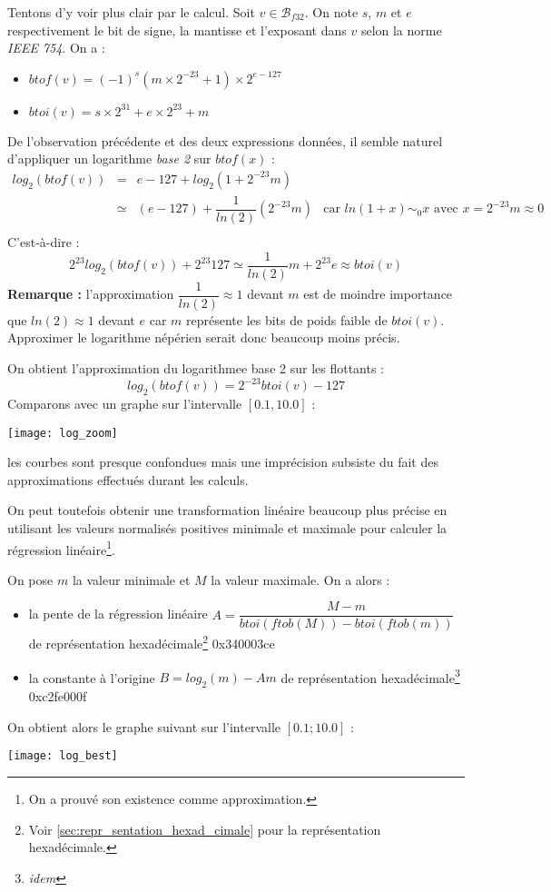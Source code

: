 \documentclass[../../main.tex]{subfiles}
\begin{document}
Tentons d'y voir plus clair par le calcul. Soit $v\in\mathcal{B}_{f32}$. On note $s$, $m$ et $e$ respectivement le bit de signe, la mantisse et l'exposant dans $v$ selon la norme \textit{IEEE 754}. On a :
\begin{itemize}
  \item $btof(v) = (-1)^{s}(m\times{2^{-23}} + 1)\times{2^{e-127}}$
  \item $btoi(v) = s\times{2^{31}} + e\times{2^23} + m$
\end{itemize}
De l'observation précédente et des deux expressions données, il semble naturel d'appliquer un logarithme \textit{base 2} sur $btof(x)$ :
$$\begin{array}{lcll}
log_2(btof(v)) & = & e - 127 + log_2\left(1 + 2^{-23}m\right) \\
& \simeq & (e - 127) + \dfrac{1}{ln(2)}\left(2^{-23}m\right) & \text{car $ln(1 + x)\sim_0 x$ avec $x = 2^{-23}m\approx{0}$} \\

\end{array}$$
C'est-à-dire :
$$2^{23}log_2(btof(v)) + 2^{23}127\simeq \dfrac{1}{ln(2)}m + 2^{23}e\approx{btoi(v)}$$
\textbf{Remarque :} l'approximation $\dfrac{1}{ln(2)}\approx 1$ devant $m$ est de moindre importance que $ln(2)\approx 1$ devant $e$ car $m$ représente les bits de poids faible de $btoi(v)$. Approximer le logarithme népérien serait donc beaucoup moins précis.

On obtient l'approximation du logarithmee base 2 sur les flottants :
$$log_2(btof(v)) = 2^{-23}btoi(v) - 127$$
Comparons avec un graphe sur l'intervalle $[0.1, 10.0]$ :
\begin{center}
  \texttt{[image: log\_zoom]}
\end{center}
les courbes sont presque confondues mais une imprécision subsiste du fait des approximations effectués durant les calculs. 

On peut toutefois obtenir une transformation linéaire beaucoup plus précise en utilisant les valeurs normalisés positives minimale et maximale pour calculer la régression linéaire\footnote{On a prouvé son existence comme approximation.}. 

On pose $m$ la valeur minimale et $M$ la valeur maximale. On a alors :
\begin{itemize}
  \item la pente de la régression linéaire $A = \dfrac{M - m}{btoi(ftob(M)) - btoi(ftob(m))}$ de représentation hexadécimale\footnote{Voir \ref{sec:repr_sentation_hexad_cimale} pour la représentation hexadécimale.} \textsf{0x340003ce}
  \item la constante à l'origine $B = log_2(m) - Am$ de représentation hexadécimale\footnote{\textit{idem}} \textsf{0xc2fe000f}
\end{itemize}
On obtient alors le graphe suivant sur l'intervalle $[0.1; 10.0]$ :
\begin{center}
  \texttt{[image: log\_best]}
\end{center}
\end{document}
